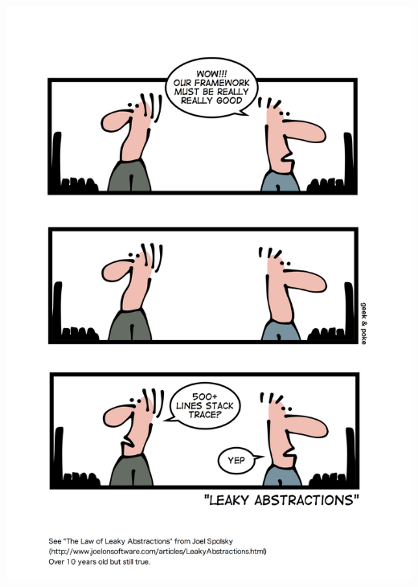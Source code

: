 \documentclass{article}
\begin{document}
\centering
\includegraphics{good-framework.jpg}

{}

\end{document}
